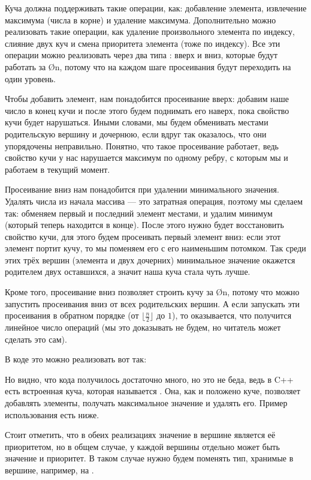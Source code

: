 Куча должна поддерживать такие операции, как: добавление элемента, извлечение максимума (числа в корне) и удаление максимума. Дополнительно можно реализовать такие операции, как удаление произвольного элемента по индексу, слияние двух куч и смена приоритета элемента (тоже по индексу). Все эти операции можно реализовать через два типа : вверх и вниз, которые будут работать за \O{\log n}, потому что на каждом шаге просеивания будут переходить на один уровень.

Чтобы добавить элемент, нам понадобится просеивание вверх: добавим наше число в конец кучи и после этого будем поднимать его наверх, пока свойство кучи будет нарушаться. Иными словами, мы будем обменивать местами родительскую вершину и дочернюю, если вдруг так оказалось, что они упорядочены неправильно. Понятно, что такое просеивание работает, ведь свойство кучи у нас нарушается максимум по одному ребру, с которым мы и работаем в текущий момент.

Просеивание вниз нам понадобится при удалении минимального значения. Удалять числа из начала массива — это затратная операция, поэтому мы сделаем так: обменяем первый и последний элемент местами, и удалим минимум (который теперь находится в конце). После этого нужно будет восстановить свойство кучи, для этого будем просеивать первый элемент вниз: если этот элемент портит кучу, то мы поменяем его с его наименьшим потомком. Так среди этих трёх вершин (элемента и двух дочерних) минимальное значение окажется родителем двух оставшихся, а значит наша куча стала чуть лучше.

Кроме того, просеивание вниз позволяет строить кучу за \O{n}, потому что можно запустить просеивания вниз от всех родительских вершин. А если запускать эти просеивания в обратном порядке (от $\lfloor\frac{n}{2}\rfloor$ до $1$), то оказывается, что получится линейное число операций (мы это доказывать не будем, но читатель может сделать это сам).

В коде это можно реализовать вот так:


Но видно, что кода получилось достаточно много, но это не беда, ведь в C++ есть встроенная куча, которая называется . Она, как и положено куче, позволяет добавлять элементы, получать максимальное значение и удалять его. Пример использования  есть ниже.


Стоит отметить, что в обеих реализациях значение в вершине является её приоритетом, но в общем случае, у каждой вершины отдельно может быть значение и приоритет. В таком случае нужно будем поменять тип, хранимые в вершине, например, на .


